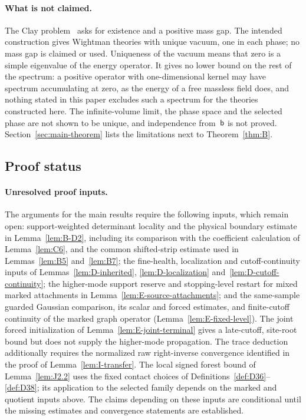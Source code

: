 \paragraph{What is not claimed.}
The Clay problem~\cite[\S4]{JaffeWitten2006} asks for existence and a positive mass gap. The intended construction gives Wightman theories with unique vacuum, one in each phase; no mass gap is claimed or used. Uniqueness of the vacuum means that zero is a simple eigenvalue of the energy operator. It gives no lower bound on the rest of the spectrum: a positive operator with one-dimensional kernel may have spectrum accumulating at zero, as the energy of a free massless field does, and nothing stated in this paper excludes such a spectrum for the theories constructed here. The infinite-volume limit, the phase space and the selected phase are not shown to be unique, and independence from~$\mathsf{b}$ is not proved. Section~\ref{sec:main-theorem} lists the limitations next to Theorem~\ref{thm:B}.

\subsection{Proof status}\label{sec:intro-source}

\paragraph{Unresolved proof inputs.}\label{par:proof-status}
The arguments for the main results require the following inputs, which remain open: support-weighted determinant locality and the physical boundary estimate in Lemma~\ref{lem:B-D2}, including its comparison with the coefficient calculation of Lemma~\ref{lem:C6}, and the common shifted-strip estimate used in Lemmas~\ref{lem:B5} and~\ref{lem:B7}; the fine-health, localization and cutoff-continuity inputs of Lemmas~\ref{lem:D-inherited}, \ref{lem:D-localization} and~\ref{lem:D-cutoff-continuity}; the higher-mode support reserve and stopping-level restart for mixed marked attachments in Lemma~\ref{lem:E-source-attachments}; and the same-sample guarded Gaussian comparison, its scalar and forced estimates, and finite-cutoff continuity of the marked graph operator (Lemma~\ref{lem:E-fixed-level}). The joint forced initialization of Lemma~\ref{lem:E-joint-terminal} gives a late-cutoff, site-root bound but does not supply the higher-mode propagation. The trace deduction additionally requires the normalized raw right-inverse convergence identified in the proof of Lemma~\ref{lem:I-transfer}. The local signed forest bound of Lemma~\ref{lem:J2.2} uses the fixed contact choices of Definitions~\ref{def:D36}--\ref{def:D38}; its application to the selected family depends on the marked and quotient inputs above. The claims depending on these inputs are conditional until the missing estimates and convergence statements are established.

